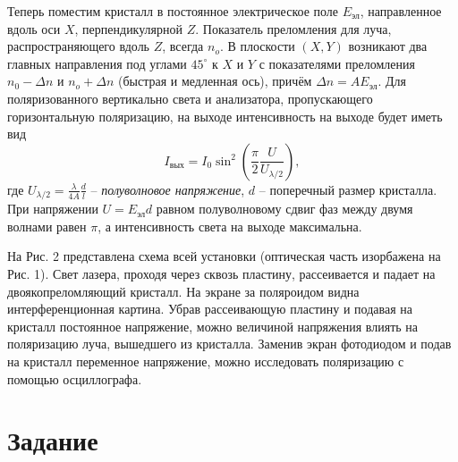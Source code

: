 \documentclass[a4paper,12pt]{extarticle}
\begin{document}
Теперь поместим кристалл в постоянное электрическое поле $E_{\text{эл}}$, направленное вдоль оси $X$, перпендикулярной $Z$. Показатель преломления для луча, распространяющего вдоль $Z$, всегда $n_o$. В плоскости $(X,Y)$ возникают два главных направления под углами $45^\circ$ к $X$ и $Y$ с показателями преломления $n_0 - \Delta n$ и $n_o + \Delta n$ (быстрая и медленная ось), причём $\Delta n = A E_{\text{эл}}$. Для поляризованного вертикально света и анализатора, пропускающего горизонтальную поляризацию, на выходе интенсивность на выходе будет иметь вид
\begin{equation}
I_{\text{вых}} = I_0 \sin^2 \left(\dfrac{\pi}{2} \dfrac{U}{U_{\lambda/2}} \right),
\end{equation}
где $\displaystyle U_{\lambda/2} = \frac{\lambda}{4A}\frac{d}{l}$ -- \textit{полуволновое напряжение}, $d$ -- поперечный размер кристалла.  При напряжении $U = E_{\text{эл}}d$ равном полуволновому сдвиг фаз между двумя волнами равен $\pi$, а интенсивность света на выходе максимальна. 


На Рис. 2 представлена схема всей установки (оптическая часть изорбажена на Рис. 1). Свет лазера, проходя через сквозь пластину, рассеивается и падает на двоякопреломляющий кристалл. На экране за поляроидом видна интерференционная картина. Убрав рассеивающую пластину и подавая на кристалл постоянное напряжение, можно величиной напряжения влиять на поляризацию луча, вышедшего из кристалла. Заменив экран фотодиодом и подав на кристалл переменное напряжение, можно исследовать поляризацию с помощью осциллографа.

\section*{Задание}
\end{document}
